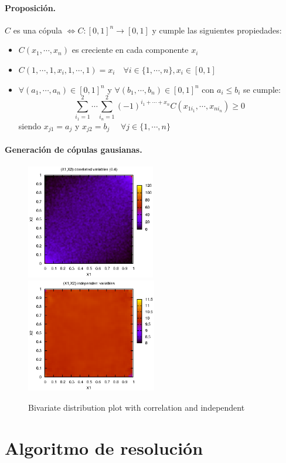 \paragraph{Proposici\'on.}
$C$ es una c\'opula $\iff C:[0,1]^n \to [0,1]$ y cumple las siguientes 
propiedades:
\begin{itemize}
\item $C(x_1, \cdots, x_n)$ es creciente en cada componente $x_i$
\item $C(1, \cdots, 1, x_i, 1, \cdots, 1) = x_i \quad \forall i \in \{1, \cdots, n\}, x_i \in [0,1]$
\item $\forall (a_1, \cdots, a_n) \in [0,1]^n$ y $\forall (b_1, \cdots, b_n) \in [0,1]^n$ con
$a_i \leq b_i$ se cumple:
\begin{displaymath}
\sum_{i_1=1}^{2} \cdots \sum_{i_n=1}^{2} (-1)^{i_1+\cdots+x_n} C(x_{1i_1},\cdots,x_{ni_n}) \geq 0
\end{displaymath}
\noindent siendo $x_{j1}=a_j$ y $x_{j2}=b_j$ $\quad \forall j \in \{1, \cdots, n\}$
\end{itemize}

\paragraph{Generaci\'on de c\'opulas gausianas.}

\begin{figure}[!hb]
\begin{center}
\includegraphics[height=5cm, angle=0]{./images/copula.eps}
\includegraphics[height=5cm, angle=0]{./images/uniform.eps}
\caption{Bivariate distribution plot with correlation and independent}
\label{copulas}
\end{center}
\end{figure}


\section{Algoritmo de resoluci\'on}

